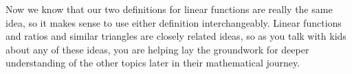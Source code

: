 \documentclass{ximera}
\begin{document}
Now we know that our two definitions for linear functions are really the same idea, so it makes sense to use either definition interchangeably. Linear functions and ratios and similar triangles are closely related ideas, so as you talk with kids about any of these ideas, you are helping lay the groundwork for deeper understanding of the other topics later in their mathematical journey.
\end{document}
